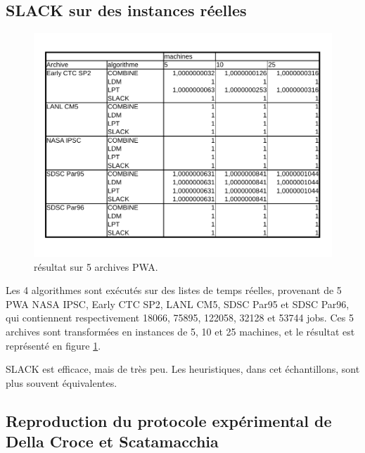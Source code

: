 \documentclass[a4paper,12pt]{report}
\theoremstyle{plain}				%
\theoremstyle{definition}				%
\begin{document}
  
\subsection{SLACK sur des instances réelles}
\label{ssec:resultatsSLACKReel}

\begin{figure}
{\centering
\includegraphics[width=\columnwidth]{2_Resultat_reel.pdf}
\caption{résultat sur 5 archives PWA.}
\label{fig:resultat5PWA}
\par}
\end{figure}
 
 Les 4 algorithmes sont exécutés sur des listes de temps réelles, provenant de 5 PWA NASA IPSC, Early CTC SP2, LANL CM5, SDSC Par95 et SDSC Par96, qui contiennent respectivement 18066, 75895, 122058, 32128 et 53744 jobs. Ces 5 archives sont transformées en instances de 5, 10 et 25 machines, et le résultat est représenté en figure \ref{fig:resultat5PWA}.
 
SLACK est efficace, mais de très peu. 
Les heuristiques, dans cet échantillons, sont plus souvent équivalentes.  
 
\subsection{Reproduction du protocole expérimental de Della Croce et Scatamacchia}
\label{ssec:resultatsReroductionPrtocoleExperimentalDellaCroceScatamacchia}
 
\end{document}
